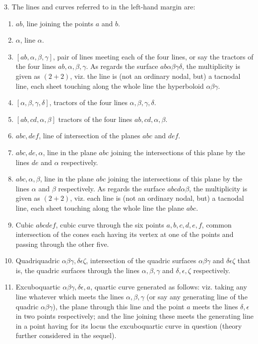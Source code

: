 \documentclass[11pt,a4paper]{article}
\begin{document}
3. The lines and curves referred to in the left-hand margin are:
\begin{enumerate}
\item $ab$, line joining the points $a$ and $b$.
\item $\alpha$, line $\alpha$.
\item $[ab,\alpha,\beta,\gamma]$, pair of lines meeting each of the four lines, or say
the tractors of the four lines $ab,\alpha,\beta,\gamma$. As regards the surface
$ab\alpha\beta\gamma\delta$, the multiplicity is given as $(2+2)$, viz. the line is
(not an ordinary nodal, but) a tacnodal line, each sheet touching along the whole
line the hyperboloid $\alpha\beta\gamma$.
\item $[\alpha,\beta,\gamma,\delta]$, tractors of the four lines
$\alpha,\beta,\gamma,\delta$.
\item $[ab,cd,\alpha,\beta]$ tractors of the four lines $ab,cd,\alpha,\beta$.
\item $abc,def$, line of intersection of the planes $abc$ and $def$.
\item $abc,de,\alpha$, line in the plane $abc$ joining the intersections of this plane
by the lines $de$ and $\alpha$ respectively.
\item $abc,\alpha,\beta$, line in the plane $abc$ joining the intersections of this
plane by the lines $\alpha$ and $\beta$ respectively. As regards the surface
$abcd\alpha\beta$, the multiplicity is given as $(2+2)$, viz. each line is (not an
ordinary nodal, but) a tacnodal line, each sheet touching along the whole line the
plane $abc$.
\item Cubic $abcdef$, cubic curve through the six points $a,b,c,d,e,f$, common
intersection of the cones each having its vertex at one of the points and passing
through the other five.
\item Quadriquadric $\alpha\beta\gamma,\delta\epsilon\zeta$, intersection of the
quadric surfaces $\alpha\beta\gamma$ and $\delta\epsilon\zeta$ that is, the quadric
surfaces through the lines $\alpha,\beta,\gamma$ and
$\delta,\epsilon,\zeta$ respectively.
\item Excuboquartic $\alpha\beta\gamma,\delta\epsilon,a$, quartic curve generated as
follows: viz. taking any line whatever which meets the lines $\alpha,\beta,\gamma$
(or say any generating line of the quadric $\alpha\beta\gamma$), the plane through
this line and the point $a$ meets the lines $\delta,\epsilon$ in two points respectively;
and the line joining these meets the generating line in a point having for its locus
the excuboquartic curve in question (theory further considered in the sequel).
\end{enumerate}
\end{document}
